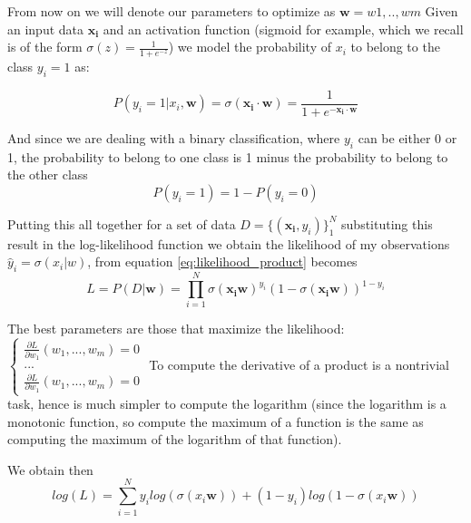 \documentclass[a4paper,11pt]{article}
\begin{document}
From now on we will denote our parameters to optimize as $\mathbf{w} = w1, .., wm $
Given an input data $\mathbf{x_i}$  and an activation function (sigmoid for example, which we recall is of the form $\sigma(z) = \frac{1}{1+e^{-z}}$) we model the probability of $x_i$ to belong to the class $y_i = 1$ as:

\begin{equation}
 P(y_i = 1 | x_i, \mathbf{w}) = \sigma(\mathbf{x_i\cdot w}) = \frac{1}{1+e^{-\mathbf{x_i \cdot w}}}
\end{equation}

And since we are dealing with a binary classification, where $y_i$ can be either 0 or 1, the probability to belong to one class is 1 minus the probability to belong to the other class
\begin{equation}
P(y_i = 1) = 1 - P(y_i = 0)
\end{equation}

Putting this all together for a set of data $D = \{ (\mathbf{x_i}, y_i)\}_1 ^N$ substituting this result in the log-likelihood function we obtain the likelihood of my observations $\hat y_i = \sigma (x_i|w)$, from equation \ref{eq:likelihood_product} becomes
\begin{equation}
L = P(D|\mathbf{w}) = \prod_{i=1}^N \sigma(\mathbf{x_i w})^{y_i} (1-\sigma(\mathbf{x_i w}))^{1-y_i}
\end{equation}

The best parameters are those that maximize the likelihood:
$\begin{cases} \frac{\partial L}{\partial w_1}(w_1, ..., w_m) = 0 \\ ... \\ \frac{\partial L}{\partial w_1}(w_1, ..., w_m) = 0 \end{cases}$
To compute the derivative of a product is a nontrivial task, hence is much simpler to compute the logarithm (since the logarithm is a monotonic function, so compute the maximum of a function is the same as computing the maximum of the logarithm of that function).

We obtain then
\begin{equation}
log(L) = \sum_{i=1}^N y_i log(\sigma(x_i \mathbf{w})) + (1-y_i)log(1-\sigma(x_i \mathbf{w}))
\end{equation}
\end{document}
